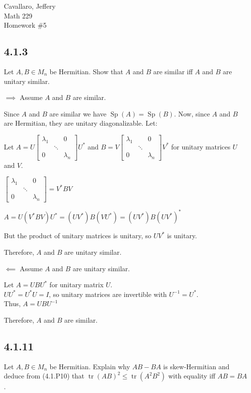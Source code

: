 \documentclass[letterpaper,12pt,fleqn]{article}
\renewcommand{\l}{\lambda}
\DeclareMathOperator{\Sp}{Sp}
\DeclareMathOperator{\tr}{tr}
\begin{document}
Cavallaro, Jeffery \\
Math 229 \\
Homework \#5

\bigskip

\subsection*{4.1.3}

Let $A,B\in M_n$ be Hermitian. Show that $A$ and $B$ are similar iff $A$ and $B$ are
unitary similar.

\begin{description}
\item $\implies$ Assume $A$ and $B$ are similar.

  Since $A$ and $B$ are similar we have $\Sp(A)=\Sp(B)$. Now, since $A$ and $B$ are
  Hermitian, they are unitary diagonalizable. Let:

  \newcommand{\dm}{\begin{bmatrix}
      \l_1 & & 0 \\
      & \ddots & \\
      0 & & \l_n
  \end{bmatrix}}
  
  Let $A=U\dm U^*$ and $B=V\dm V^*$ for unitary matrices $U$ and $V$.

  $\dm=V^*BV$

  $A=U(V^*BV)U^*=(UV^*)B(VU^*)=(UV^*)B(UV^*)^*$

  But the product of unitary matrices is unitary, so $UV^*$ is unitary.

  Therefore, $A$ and $B$ are unitary similar.

\item $\impliedby$ Assume $A$ and $B$ are unitary similar.

  Let $A=UBU^*$ for unitary matrix $U$. \\
  $UU^*=U^*U=I$, so unitary matrices are invertible with $U^{-1}=U^*$. \\
  Thus, $A=UBU^{-1}$

  Therefore, $A$ and $B$ are similar.
\end{description}

\subsection*{4.1.11}

Let $A,B\in M_n$ be Hermitian. Explain why $AB-BA$ is skew-Hermitian and deduce from
(4.1.P10) that $\tr(AB)^2\le\tr(A^2B^2)$ with equality iff $AB=BA$.
\end{document}
